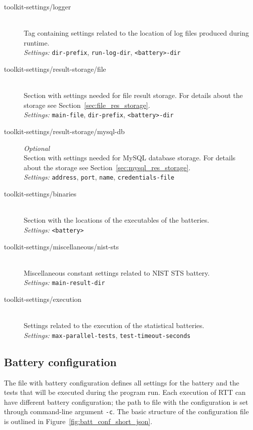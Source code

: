 \documentclass[
	digital,    %
	oneside,    %
	color,
	11pt,
	nocover,
	notable,
	nolof,
	nolot,
]{fithesis3}
\theoremstyle{definition}
\theoremstyle{remark}
\begin{document}
\begin{description}
\item[toolkit-settings/logger] \hfill \\
Tag containing settings related to the location of log files produced during runtime. \\
\textit{Settings: } \texttt{dir-prefix}, \texttt{run-log-dir}, \texttt{<battery>-dir}

\item[toolkit-settings/result-storage/file] \hfill \\
Section with settings needed for file result storage. For details about the storage see Section~\ref{sec:file_res_storage}. \\
\textit{Settings: } \texttt{main-file}, \texttt{dir-prefix}, \texttt{<battery>-dir}

\item[toolkit-settings/result-storage/mysql-db] \textit{Optional} \hfill \\
Section with settings needed for MySQL database storage. For details about the storage see Section~\ref{sec:mysql_res_storage}. \\
\textit{Settings: } \texttt{address}, \texttt{port}, \texttt{name}, \texttt{credentials-file}

\item[toolkit-settings/binaries] \hfill \\
Section with the locations of the executables of the batteries. \\
\textit{Settings: } \texttt{<battery>}

\item[toolkit-settings/miscellaneous/nist-sts] \hfill \\
Miscellaneous constant settings related to NIST STS battery. \\
\textit{Settings: } \texttt{main-result-dir}

\item[toolkit-settings/execution] \hfill \\
Settings related to the execution of the statistical batteries. \\
\textit{Settings: } \texttt{max-parallel-tests}, \texttt{test-timeout-seconds}

\end{description}

\subsection{Battery configuration}
\label{sec:batt_conf}
The file with battery configuration defines all settings for the battery and the tests that will be executed during the program run. Each execution of RTT can have different battery configuration; the path to file with the configuration is set through command-line argument \texttt{-c}. The basic structure of the configuration file is outlined in Figure~\ref{fig:batt_conf_short_json}. 
\end{document}
